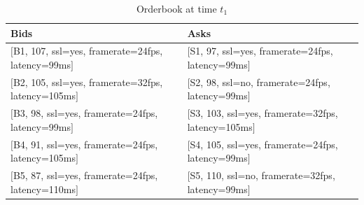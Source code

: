 \documentclass[10pt,journal,compsoc]{IEEEtran}
\begin{document}
\begin{table}
\centering
\begin{tabular}{ll}
\toprule
Bids & Asks \\
\midrule
\cellcolor[gray]{0.9}$[$\small{B1, 107, ssl=yes, framerate=24fps, latency=99ms}$]$ & \cellcolor[gray]{0.9}$[$\small{S1, 97, ssl=yes, framerate=24fps, latency=99ms}$]$ \\
\cellcolor[gray]{0.9}$[$\small{B2, 105, ssl=yes, framerate=32fps, latency=105ms}$]$ & $[$\small{S2, 98, ssl=no, framerate=24fps, latency=99ms}$]$ \\
$[$\small{B3, 98, ssl=yes, framerate=24fps, latency=99ms}$]$ & \cellcolor[gray]{0.9}$[$\small{S3, 103, ssl=yes, framerate=32fps, latency=105ms}$]$  \\
$[$\small{B4, 91, ssl=yes, framerate=24fps, latency=105ms}$]$ & $[$\small{S4, 105, ssl=yes, framerate=24fps, latency=99ms}$]$ \\
$[$\small{B5, 87, ssl=yes, framerate=24fps, latency=110ms}$]$ &$[$\small{S5, 110, ssl=no, framerate=32fps, latency=99ms}$]$ \\
\bottomrule
\end{tabular}
\caption{Orderbook at time $t_{1}$ \label{orderbook-after-one-pass}}
\end{table}
\end{document}
